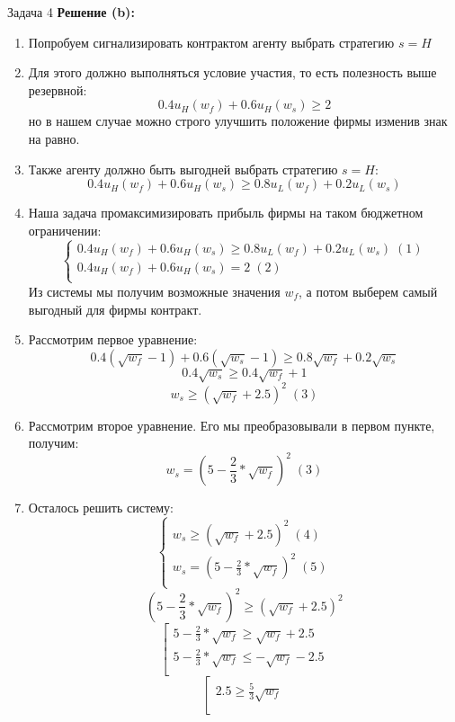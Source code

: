\begin{mybox}{Задача 4}
    \textbf{Решение (b):}
    \begin{enumerate}
        \item Попробуем сигнализировать контрактом агенту выбрать стратегию $s=H$
        \item Для этого должно выполняться условие участия, то есть полезность выше резервной: $$0.4u_H(w_f)+0.6u_H(
        w_s)\geq2$$ но в нашем случае можно строго улучшить положение фирмы изменив знак на равно.
        \item Также агенту должно быть выгодней выбрать стратегию $s=H$: $$0.4u_H(w_f)+0.6u_H(w_s)\geq0.8u_L(w_f)+0
        .2u_L(w_s)$$
        \item Наша задача промаксимизировать прибыль фирмы на таком бюджетном ограничении: $$\begin{cases}
            0.4u_H(w_f)+0.6u_H(w_s)\geq0.8u_L(w_f)+0.2u_L(w_s) \;(1)\\
            0.4u_H(w_f)+0.6u_H(w_s)=2\; (2) \\
        \end{cases}$$
        Из системы мы получим возможные значения $w_f$, а потом выберем самый выгодный для фирмы контракт.
        \item Рассмотрим первое уравнение: $$0.4(\sqrt{w_f}-1)+0.6(\sqrt{w_s}-1)\geq0.8\sqrt{w_f}+0.2\sqrt{w_s}$$
        $$0.4\sqrt{w_s}\geq0.4\sqrt{w_f}+1$$
        $$w_s\geq(\sqrt{w_f}+2.5)^2\; (3)$$
        \item Рассмотрим второе уравнение. Его мы преобразовывали в первом пункте, получим:
        $$w_s=(5-\frac{2}{3}*\sqrt{w_f})^2\;(3)$$
        \item Осталось решить систему: $$\begin{cases}
            w_s\geq(\sqrt{w_f}+2.5)^2\; (4) \\
            w_s=(5-\frac{2}{3}*\sqrt{w_f})^2\;(5) \\
        \end{cases}$$
        $$(5-\frac{2}{3}*\sqrt{w_f})^2\geq(\sqrt{w_f}+2.5)^2$$
        $$\left[
          \begin{gathered}
              5-\frac{2}{3}*\sqrt{w_f}\geq\sqrt{w_f}+2.5 \\
              5-\frac{2}{3}*\sqrt{w_f}\leq-\sqrt{w_f}-2.5 \\
          \end{gathered}
        \right.$$
        $$\left[
          \begin{gathered}
              2.5\geq\frac{5}{3}\sqrt{w_f} \\

\end{gathered}$$
\end{enumerate}
\end{mybox}
